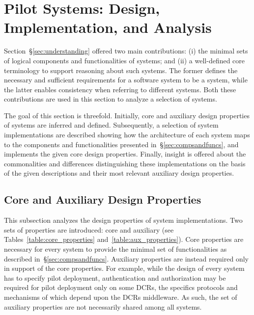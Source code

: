 \documentclass{sig-alternate}
\begin{document}
\section{Pilot Systems: Design, Implementation, and Analysis}
\label{sec:analysis}

Section~\S\ref{sec:understanding} offered two main contributions: (i) the
minimal sets of logical components and functionalities of \pilot systems; and
(ii) a well-defined core terminology to support reasoning about such systems.
The former defines the necessary and sufficient requirements for a software
system to be a \pilot system, while the latter enables consistency when
referring to different \pilot systems. Both these contributions are used in this
section to analyze a selection of \pilot systems.


The goal of this section is threefold. Initially, core and auxiliary design
properties of \pilot systems are inferred and defined. Subsequently, a selection
of \pilot system implementations are described showing how the architecture of
each system maps to the components and functionalities presented
in~\S\ref{sec:compsandfuncs}, and implements the given core design properties.
Finally, insight is offered about the commonalities and differences
distinguishing these implementations on the basis of the given descriptions and
their most relevant auxiliary design properties.


 

%
\subsection{Core and Auxiliary Design Properties}
\label{sec:properties}

This subsection analyzes the design properties of \pilot system implementations.
Two sets of properties are introduced: core and auxiliary (see
Tables~\ref{table:core_properties} and~\ref{table:aux_properties}). Core
properties are necessary for every \pilot system to provide the minimal set of
functionalities as described in~\S\ref{sec:compsandfuncs}. Auxiliary properties
are instead required only in support of the core properties. For example, while
the design of every \pilot system has to specify pilot deployment,
authentication and authorization may be required for pilot deployment only on
some DCRs, the specifics protocols and mechanisms of which depend upon the DCRs
middleware. As such, the set of auxiliary properties are not necessarily shared
among all \pilot systems.
\end{document}
